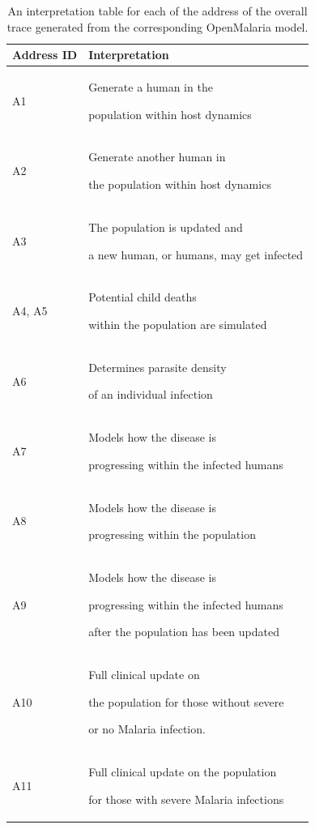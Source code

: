\documentclass{article}
\begin{document}
\begin{table}[h!]
  \footnotesize
  \setlength{\tabcolsep}{1mm}
  \caption{An interpretation table for each of the address of the 
  overall trace generated from the corresponding OpenMalaria model.}
  \label{table:addresses}
  \begin{tabularx}{0.46\textwidth}{@{}lX@{}} 
    \toprule
    Address ID & Interpretation \\
    \midrule
  A1 & Generate a human in the

   population within host dynamics\\

  
  A2 & Generate another human in

   the population within host dynamics\\

  A3 & The population is updated and 

  a new human, or humans, may get infected \\

  A4, A5 & Potential child deaths 

  within the population are simulated \\

  A6 & Determines parasite density

   of an individual infection \\

  A7 & Models how the disease is 

  progressing within the infected humans \\

	A8 & Models how the disease is

	 progressing within the population \\
  
  A9 & Models how the disease is 

  progressing within the infected humans

   after the population has been updated\\

  A10 & Full clinical update on 

  the population for those without severe

  or no Malaria infection. \\

A11 & Full clinical update on the population 

for those with severe Malaria infections \\
\bottomrule
  \end{tabularx}
  \end{table}
\end{document}
